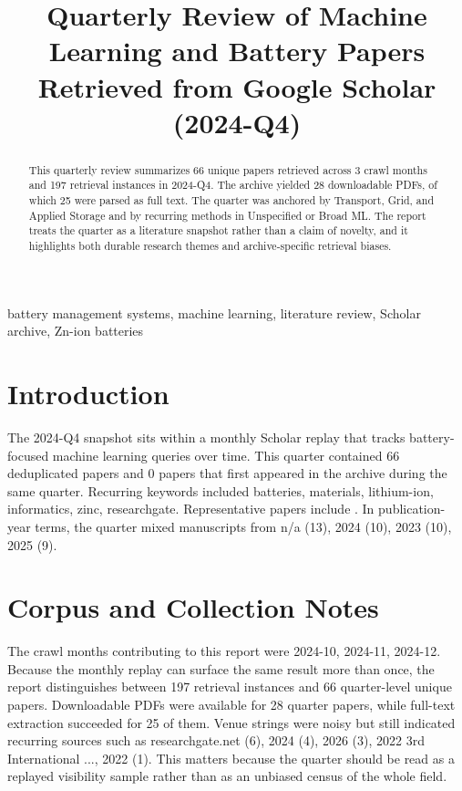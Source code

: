 \documentclass[conference]{IEEEtran}
\begin{document}
\title{ Quarterly Review of Machine Learning and Battery Papers Retrieved from Google Scholar (2024-Q4) }

\author{
}

\maketitle

\begin{abstract}
This quarterly review summarizes 66 unique papers retrieved across 3 crawl months and 197 retrieval instances in 2024-Q4. The archive yielded 28 downloadable PDFs, of which 25 were parsed as full text. The quarter was anchored by Transport, Grid, and Applied Storage and by recurring methods in Unspecified or Broad ML. The report treats the quarter as a literature snapshot rather than a claim of novelty, and it highlights both durable research themes and archive-specific retrieval biases.
\end{abstract}

\begin{IEEEkeywords}
battery management systems, machine learning, literature review, Scholar archive, Zn-ion batteries
\end{IEEEkeywords}

\section{Introduction}
The 2024-Q4 snapshot sits within a monthly Scholar replay that tracks battery-focused machine learning queries over time. This quarter contained 66 deduplicated papers and 0 papers that first appeared in the archive during the same quarter. Recurring keywords included batteries, materials, lithium-ion, informatics, zinc, researchgate. Representative papers include \cite{machinelearningdriven2025,socestimationof2023,textminingfor2022,recentadvancesin2025}. In publication-year terms, the quarter mixed manuscripts from n/a (13), 2024 (10), 2023 (10), 2025 (9).

\section{Corpus and Collection Notes}
The crawl months contributing to this report were 2024-10, 2024-11, 2024-12. Because the monthly replay can surface the same result more than once, the report distinguishes between 197 retrieval instances and 66 quarter-level unique papers. Downloadable PDFs were available for 28 quarter papers, while full-text extraction succeeded for 25 of them. Venue strings were noisy but still indicated recurring sources such as researchgate.net (6), 2024 (4), 2026 (3), 2022 3rd International ..., 2022 (1). This matters because the quarter should be read as a replayed visibility sample rather than as an unbiased census of the whole field.
\end{document}
